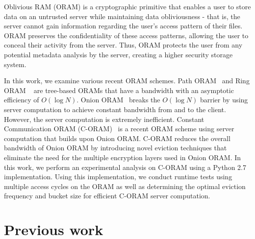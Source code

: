 \documentclass[12pt, oneside]{article}   	%
\begin{document}
Oblivious RAM (ORAM) is a cryptographic primitive that enables a user to store data on an untrusted server while maintaining data obliviousness - that is, the server cannot gain information regarding the user's access pattern of their files. ORAM preserves the confidentiality of these access patterns, allowing the user to conceal their activity from the server. Thus, ORAM protects the user from any potential metadata analysis by the server, creating a higher security storage system.

In this work, we examine various recent ORAM schemes. Path ORAM~\cite{PathORAM} and Ring ORAM ~\cite{RingORAM} are tree-based ORAMs that have a bandwidth with an asymptotic efficiency of $O (\log N )$. Onion ORAM~\cite{OnionORAM} breaks the $O (\log N )$ barrier by using server computation to achieve constant bandwidth from and to the client. However, the server computation is extremely inefficient. Constant Communication ORAM (C-ORAM)~\cite{C-ORAM} is a recent ORAM scheme using server computation that builds upon Onion ORAM. C-ORAM reduces the overall bandwidth of Onion ORAM by introducing novel eviction techniques that eliminate the need for the multiple encryption layers used in Onion ORAM. In this work, we perform an experimental analysis on C-ORAM using a Python 2.7 implementation. Using this implementation, we conduct runtime tests using multiple access cycles on the ORAM as well as determining the optimal eviction frequency and bucket size for efficient C-ORAM server computation.



\section{Previous work}
\end{document}
